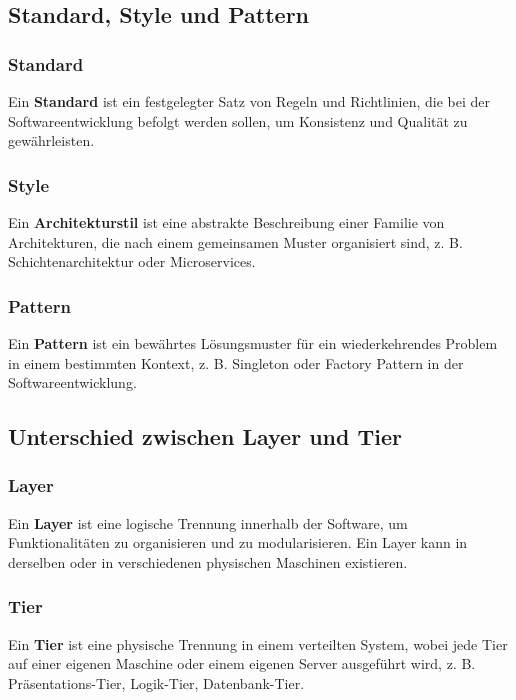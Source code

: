 \subsection{Standard, Style und Pattern}

\subsubsection{Standard}

Ein \textbf{Standard} ist ein festgelegter Satz von Regeln und Richtlinien, die bei der Softwareentwicklung befolgt werden sollen, um Konsistenz und Qualität zu gewährleisten.

\subsubsection{Style}

Ein \textbf{Architekturstil} ist eine abstrakte Beschreibung einer Familie von Architekturen, die nach einem gemeinsamen Muster organisiert sind, z. B. Schichtenarchitektur oder Microservices.

\subsubsection{Pattern}

Ein \textbf{Pattern} ist ein bewährtes Lösungsmuster für ein wiederkehrendes Problem in einem bestimmten Kontext, z. B. Singleton oder Factory Pattern in der Softwareentwicklung.

\subsection{Unterschied zwischen Layer und Tier}

\subsubsection{Layer}

Ein \textbf{Layer} ist eine logische Trennung innerhalb der Software, um Funktionalitäten zu organisieren und zu modularisieren. Ein Layer kann in derselben oder in verschiedenen physischen Maschinen existieren.

\subsubsection{Tier}

Ein \textbf{Tier} ist eine physische Trennung in einem verteilten System, wobei jede Tier auf einer eigenen Maschine oder einem eigenen Server ausgeführt wird, z. B. Präsentations-Tier, Logik-Tier, Datenbank-Tier.

